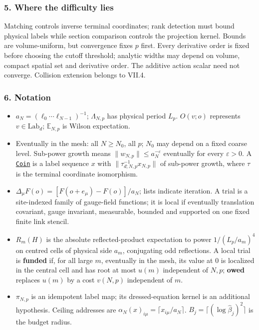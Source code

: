 \documentclass[
  letterpaper,
  11pt]{article}
\providecommand{\tightlist}{%
  \setlength{\itemsep}{0pt}\setlength{\parskip}{0pt}}
\begin{document}
\subsubsection{5. Where the difficulty
lies}\label{where-the-difficulty-lies-14}

Matching controls inverse terminal coordinates; rank detection must
bound physical labels while section comparison controls the projection
kernel. Bounds are volume-uniform, but convergence fixes \(p\) first.
Every derivative order is fixed before choosing the cutoff threshold;
analytic widths may depend on volume, compact spatial set and derivative
order. The additive action scalar need not converge. Collision extension
belongs to VII.4.

\subsubsection{6. Notation}\label{notation-14}

\begin{itemize}
\tightlist
\item
  \(a_N=(\ell_0\cdots\ell_{N-1})^{-1}\); \(\Lambda_{N,p}\) has physical
  period \(L_p\). \(O(v;o)\) represents \(v\in\mathrm{Lab}_d\);
  \(\mathbb E_{N,p}\) is Wilson expectation.
\item
  Eventually in the mesh: all \(N\ge N_0\), all \(p\); \(N_0\) may
  depend on a fixed coarse level. Sub-power growth means
  \(\|w_{N,p}\|\le a_N^{-\varepsilon}\) eventually for every
  \(\varepsilon>0\). A
  \href{https://github.com/yang-mills-group/OpenAI-YM-20261028/blob/3456e5e75cf8d4cd558955a5c7638fba2d68f464/YM/FullVolume/Sluggish.lean\#L146-L147}{\texttt{Coin}}
  is a label sequence \(x\) with \(\|\tau_{d;N,p}^{-1}x_{N,p}\|\) of
  sub-power growth, where \(\tau\) is the terminal coordinate
  isomorphism.
\item
  \(\Delta_\mu F(o)=[F(o+e_\mu)-F(o)]/a_N\); lists indicate iteration. A
  trial is a site-indexed family of gauge-field functions; it is local
  if eventually translation covariant, gauge invariant, measurable,
  bounded and supported on one fixed finite link stencil.
\item
  \(R_m(H)\) is the absolute reflected-product expectation to power
  \(1/(L_p/a_m)^4\) on centred cells of physical side \(a_m\),
  conjugating odd reflections. A local trial is \textbf{funded} if, for
  all large \(m\), eventually in the mesh, its value at \(0\) is
  localized in the central cell and has root at most \(u(m)\)
  independent of \(N,p\); \textbf{owed} replaces \(u(m)\) by a cost
  \(v(N,p)\) independent of \(m\).
\item
  \(\pi_{N,p}\) is an idempotent label map; its dressed-equation kernel
  is an additional hypothesis. Ceiling addresses are
  \(\alpha_N(x)_{i\mu}=\lceil x_{i\mu}/a_N\rceil\).
  \(B_j=\lceil(\log\hat\beta_j)^2\rceil\) is the budget radius.
\end{itemize}
\end{document}
